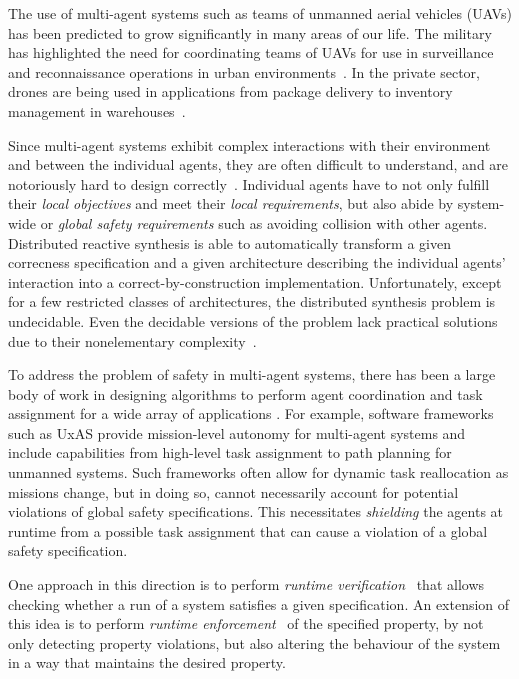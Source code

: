 The use of multi-agent systems such as teams of unmanned aerial vehicles (UAVs) has been predicted to grow significantly in many areas of our life. The military has highlighted the need for coordinating teams of UAVs for use in surveillance and reconnaissance operations in urban environments~\cite{semsch2009autonomous,samad2007network}. In the private sector, drones are being used in applications from package delivery to inventory management in warehouses~\cite{ong2007multi}. 

Since multi-agent systems exhibit complex interactions with their environment and between the individual agents, they are often difficult to understand, and are notoriously hard to design correctly~\cite{Netflix}. Individual agents have to not only fulfill their \emph{local objectives} and meet their \emph{local requirements}, but also abide by system-wide or \emph{global safety requirements} such as avoiding collision with other agents.  Distributed reactive synthesis is able to automatically transform a given correcness specification and a given architecture describing the individual agents' interaction into a correct-by-construction implementation. Unfortunately, except for a few restricted classes of architectures, the distributed synthesis problem is undecidable. Even the decidable versions of the problem lack practical solutions due to their nonelementary complexity~\cite{Schewe08}.  
 
To address the problem of safety in multi-agent systems, there has been a large body of work in designing algorithms to perform agent coordination and task assignment for a wide array of  applications \cite{bertuccelli2009real,sujit2005multi}. For example, software frameworks such as UxAS \cite{rasmussen2018brief} provide mission-level autonomy for multi-agent systems and include capabilities from high-level task assignment to path planning for unmanned systems. Such frameworks often allow for dynamic task reallocation as missions change, but in doing so, cannot necessarily account for potential violations of global safety specifications. This necessitates \emph{shielding} the agents at runtime from a possible task assignment that can cause a violation of a global safety specification.

One approach in this direction is to perform \emph{runtime verification}~\cite{BauerLS11} that allows checking whether a run of a system
satisfies a given specification.  An extension of this idea is to perform \emph{runtime enforcement}~\cite{Schneider00, Falcone10} of the specified property, by not only detecting property violations, but also altering the behaviour of the system in a way that maintains the desired property.



